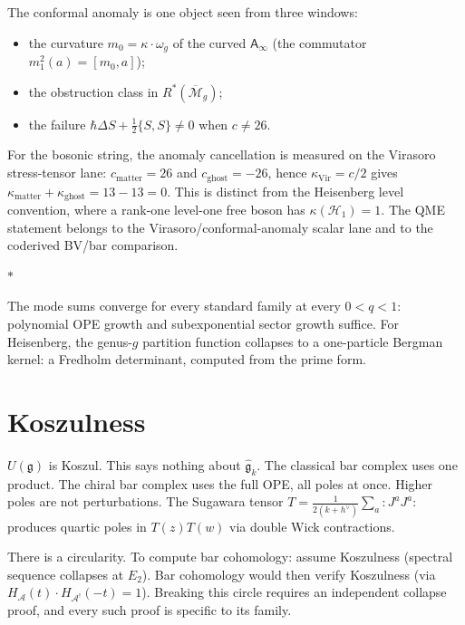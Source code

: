 \documentclass[11pt]{article}
\newcommand{\cA}{\mathcal{A}}
\newcommand{\cM}{\mathcal{M}}
\newcommand{\cH}{\mathcal{H}}
\newcommand{\fg}{\mathfrak{g}}
\newcommand{\Ainf}{\mathsf{A}_{\infty}}
\newcommand{\normord}[1]{:\!#1\!:}
\newcommand{\sep}{\bigskip\begin{center}$*$\end{center}\medskip}
\begin{document}
The conformal anomaly is one object seen from three windows:
\begin{itemize}[nosep]
\item the curvature $m_0 = \kappa \cdot \omega_g$ of the curved
  $\Ainf$ (the commutator $m_1^2(a) = [m_0, a]$);
\item the obstruction class in $R^*(\overline{\cM}_g)$;
\item the failure $\hbar\Delta S + \tfrac{1}{2}\{S,S\} \neq 0$
  when $c \neq 26$.
\end{itemize}

For the bosonic string, the anomaly cancellation is measured on
the Virasoro stress-tensor lane: $c_{\mathrm{matter}}=26$ and
$c_{\mathrm{ghost}}=-26$, hence
$\kappa_{\mathrm{Vir}}=c/2$ gives
$\kappa_{\mathrm{matter}}+\kappa_{\mathrm{ghost}}=13-13=0$.
This is distinct from the Heisenberg level convention, where a
rank-one level-one free boson has $\kappa(\cH_1)=1$.  The QME
statement belongs to the Virasoro/conformal-anomaly scalar lane
and to the coderived BV/bar comparison.

\sep

The mode sums converge for every standard family at every
$0 < q < 1$: polynomial OPE growth and subexponential sector
growth suffice.  For Heisenberg, the genus-$g$ partition function
collapses to a one-particle Bergman kernel: a Fredholm determinant,
computed from the prime form.


\section{Koszulness}
\label{sec:koszulness}

$U(\fg)$ is Koszul.  This says nothing about $\widehat{\fg}_k$.
The classical bar complex uses one product.  The chiral bar
complex uses the full OPE, all poles at once.  Higher poles are
not perturbations.  The Sugawara tensor
$T = \frac{1}{2(k+h^\vee)}\sum_a \normord{J^a J^a}$ produces
quartic poles in $T(z)T(w)$ via double Wick contractions.

There is a circularity.  To compute bar cohomology: assume
Koszulness (spectral sequence collapses at $E_2$).  Bar
cohomology would then verify Koszulness (via
$H_\cA(t) \cdot H_{\cA^!}(-t) = 1$).  Breaking this circle
requires an independent collapse proof, and every such proof
is specific to its family.
\end{document}
